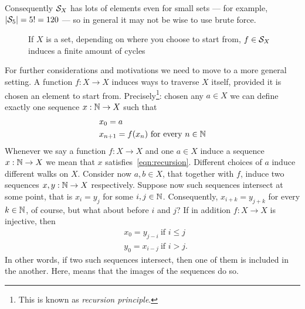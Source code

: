 Consequently \(\mathcal S_X\) has lots of elements even for small sets --- for example, \(\left\lvert\mathcal S_5\right\rvert = 5! = 120\) --- so in general it may not be wise to use brute force.

\begin{figure}
\centering
{}
\caption{If \(X\) is a set, depending on where you choose to start from, \(f \in \mathcal S_X\) induces a finite amount of cycles}
\label{fig:paths}
\end{figure}

For further considerations and motivations we need to move to a more general setting. A function \(f : X \to X\) induces ways to traverse \(X\) itself, provided it is chosen an element to start from. Precisely\footnote{This is known as {\em recursion principle}.}: chosen any \(a \in X\) we can define exactly one sequence \(x : \mathbb N \to X\) such that
%
\begin{equation}
\begin{aligned}
& x_0 = a \\
& x_{n+1} = f(x_n) \ \text{for every } n \in \mathbb N
\end{aligned}
\label{eqn:recursion}
\end{equation}
%
Whenever we say a function \(f : X \to X\) and one \(a \in X\) induce a sequence \(x : \mathbb N \to X\) we mean that \(x\) satisfies~\eqref{eqn:recursion}. Different choices of \(a\) induce different walks on \(X\). Consider now \(a, b \in X\), that together with \(f\), induce two sequences \(x, y : \mathbb N \to X\) respectively. Suppose now such sequences intersect at some point, that is \(x_i = y_j\) for some \(i, j \in \mathbb N\). Consequently, \(x_{i+k} = y_{j+k}\) for every \(k \in \mathbb N\), of course, but what about  before \(i\) and \(j\)? If in addition \(f : X \to X\) is injective, then
\begin{align*}
& x_0 = y_{j-i} \ \text{if } i \le j \\
& y_0 = x_{i-j} \ \text{if } i > j .
\end{align*}
In other words, if two such sequences intersect, then one of them is included in the another. Here,  means that the images of the sequences do so.

